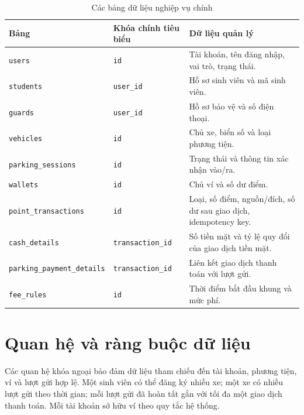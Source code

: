 \begin{table}[htbp]
\centering
\caption{Các bảng dữ liệu nghiệp vụ chính}
\label{tab:database-tables}
\begin{tabular}{|p{4cm}|p{3cm}|p{6cm}|}
\hline
\textbf{Bảng} & \textbf{Khóa chính tiêu biểu} & \textbf{Dữ liệu quản lý} \\ \hline
\texttt{users} & \texttt{id} & Tài khoản, tên đăng nhập, vai trò, trạng thái. \\ \hline
\texttt{students} & \texttt{user\_id} & Hồ sơ sinh viên và mã sinh viên. \\ \hline
\texttt{guards} & \texttt{user\_id} & Hồ sơ bảo vệ và số điện thoại. \\ \hline
\texttt{vehicles} & \texttt{id} & Chủ xe, biển số và loại phương tiện. \\ \hline
\texttt{parking\_sessions} & \texttt{id} & Trạng thái và thông tin xác nhận vào/ra. \\ \hline
\texttt{wallets} & \texttt{id} & Chủ ví và số dư điểm. \\ \hline
\texttt{point\_transactions} & \texttt{id} & Loại, số điểm, nguồn/đích, số dư sau giao dịch, idempotency key. \\ \hline
\texttt{cash\_details} & \texttt{transaction\_id} & Số tiền mặt và tỷ lệ quy đổi của giao dịch tiền mặt. \\ \hline
\texttt{parking\_payment\_details} & \texttt{transaction\_id} & Liên kết giao dịch thanh toán với lượt gửi. \\ \hline
\texttt{fee\_rules} & \texttt{id} & Thời điểm bắt đầu khung và mức phí. \\ \hline
\end{tabular}
\end{table}

\section{Quan hệ và ràng buộc dữ liệu}

Các quan hệ khóa ngoại bảo đảm dữ liệu tham chiếu đến tài khoản, phương tiện, ví và lượt gửi hợp lệ. Một sinh viên có thể đăng ký nhiều xe; một xe có nhiều lượt gửi theo thời gian; mỗi lượt gửi đã hoàn tất gắn với tối đa một giao dịch thanh toán. Mỗi tài khoản sở hữu ví theo quy tắc hệ thống.

